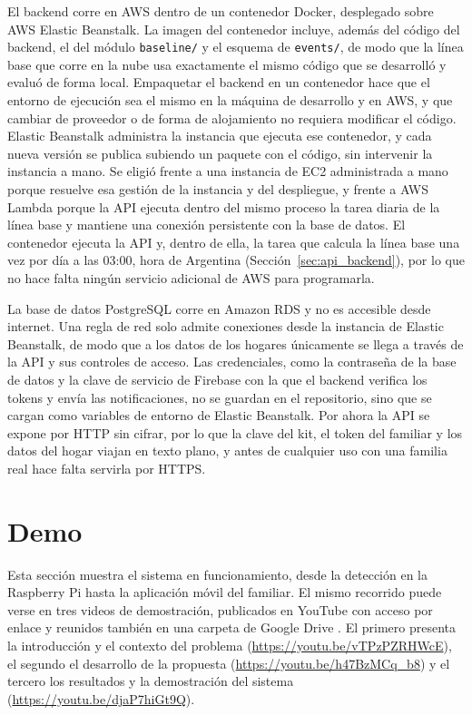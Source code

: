 El backend corre en AWS dentro de un contenedor Docker, desplegado sobre AWS Elastic Beanstalk.
La imagen del contenedor incluye, además del código del backend, el del módulo \texttt{baseline/} y el esquema de \texttt{events/}, de modo que la línea base que corre en la nube usa exactamente el mismo código que se desarrolló y evaluó de forma local.
Empaquetar el backend en un contenedor hace que el entorno de ejecución sea el mismo en la máquina de desarrollo y en AWS, y que cambiar de proveedor o de forma de alojamiento no requiera modificar el código.
Elastic Beanstalk administra la instancia que ejecuta ese contenedor, y cada nueva versión se publica subiendo un paquete con el código, sin intervenir la instancia a mano.
Se eligió frente a una instancia de EC2 administrada a mano porque resuelve esa gestión de la instancia y del despliegue, y frente a AWS Lambda porque la API ejecuta dentro del mismo proceso la tarea diaria de la línea base y mantiene una conexión persistente con la base de datos.
El contenedor ejecuta la API y, dentro de ella, la tarea que calcula la línea base una vez por día a las 03:00, hora de Argentina (Sección~\ref{sec:api_backend}), por lo que no hace falta ningún servicio adicional de AWS para programarla.

La base de datos PostgreSQL corre en Amazon RDS y no es accesible desde internet.
Una regla de red solo admite conexiones desde la instancia de Elastic Beanstalk, de modo que a los datos de los hogares únicamente se llega a través de la API y sus controles de acceso.
Las credenciales, como la contraseña de la base de datos y la clave de servicio de Firebase con la que el backend verifica los tokens y envía las notificaciones, no se guardan en el repositorio, sino que se cargan como variables de entorno de Elastic Beanstalk.
Por ahora la API se expone por HTTP sin cifrar, por lo que la clave del kit, el token del familiar y los datos del hogar viajan en texto plano, y antes de cualquier uso con una familia real hace falta servirla por HTTPS.

\section{Demo}
\label{sec:demo}

Esta sección muestra el sistema en funcionamiento, desde la detección en la Raspberry Pi hasta la aplicación móvil del familiar.
El mismo recorrido puede verse en tres videos de demostración, publicados en YouTube con acceso por enlace y reunidos también en una carpeta de Google Drive \parencite{VideosLares2026}.
El primero presenta la introducción y el contexto del problema (\url{https://youtu.be/vTPzPZRHWcE}), el segundo el desarrollo de la propuesta (\url{https://youtu.be/h47BzMCq_b8}) y el tercero los resultados y la demostración del sistema (\url{https://youtu.be/djaP7hiGt9Q}).

